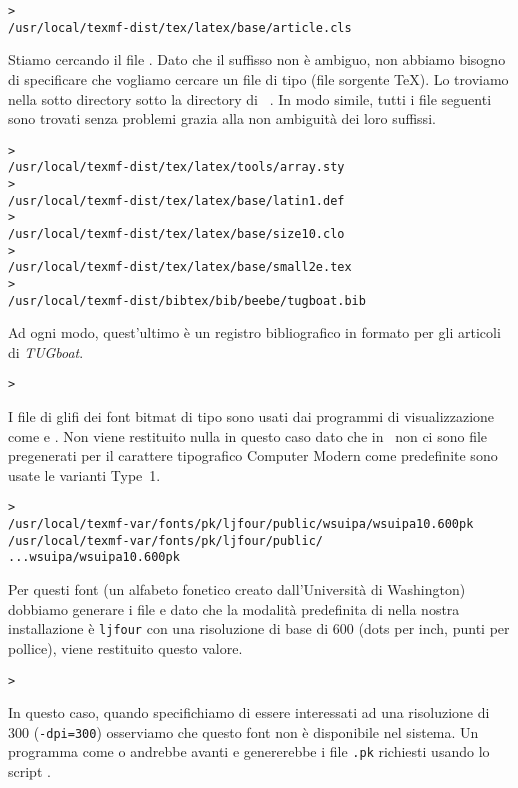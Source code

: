 \documentclass{article}
\begin{document}
\begin{alltt}
> 
   /usr/local/texmf-dist/tex/latex/base/article.cls
\end{alltt}
Stiamo cercando il file . Dato che il suffisso
 non è ambiguo, non abbiamo bisogno di specificare che vogliamo
cercare un file di tipo  (file sorgente \TeX). Lo troviamo
nella sotto directory  sotto la directory di \TL\
. In modo simile, tutti i file seguenti sono trovati
senza problemi grazia alla non ambiguità dei loro suffissi.
\begin{alltt}
> 
   /usr/local/texmf-dist/tex/latex/tools/array.sty
> 
   /usr/local/texmf-dist/tex/latex/base/latin1.def
> 
   /usr/local/texmf-dist/tex/latex/base/size10.clo
> 
   /usr/local/texmf-dist/tex/latex/base/small2e.tex
> 
   /usr/local/texmf-dist/bibtex/bib/beebe/tugboat.bib
\end{alltt}

Ad ogni modo, quest'ultimo è un registro bibliografico in formato
\BibTeX{} per gli articoli di \textsl{TUGboat}.

\begin{alltt}
> 
\end{alltt}
I file di glifi dei font bitmat di tipo  sono usati dai
programmi di visualizzazione come \cmdname{dvips} e \cmdname{xdvi}. Non
viene restituito nulla in questo caso dato che in \TL\ non ci sono file
\samp{.pk} pregenerati per il carattere tipografico Computer Modern \Dash
come predefinite sono usate le varianti Type~1.
\begin{alltt}
> 
\ifSingleColumn   /usr/local/texmf-var/fonts/pk/ljfour/public/wsuipa/wsuipa10.600pk
\else /usr/local/texmf-var/fonts/pk/ljfour/public/
...                         wsuipa/wsuipa10.600pk
\fi\end{alltt}
Per questi font (un alfabeto fonetico creato dall'Università di
Washington) dobbiamo generare i file  e dato che la modalità
predefinita di \MF{} nella nostra installazione è \texttt{ljfour} con una
risoluzione di base di 600\dpi{} (dots per inch, punti per pollice), viene
restituito questo valore.
\begin{alltt}
> 
\end{alltt}
In questo caso, quando specifichiamo di essere interessati ad una
risoluzione di 300\dpi{} (\texttt{-dpi=300}) osserviamo che questo font
non è disponibile nel sistema. Un programma come \cmdname{dvips} o
\cmdname{xdvi} andrebbe avanti e genererebbe i file \texttt{.pk} richiesti
usando lo script \cmdname{mktexpk}.
\end{document}
